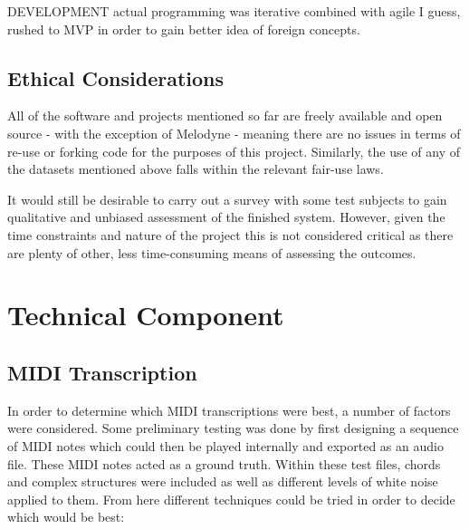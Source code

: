 \documentclass[12pt,]{article}
\begin{document}
DEVELOPMENT actual programming was iterative combined with agile I
guess, rushed to MVP in order to gain better idea of foreign concepts.

\hypertarget{ethical-considerations}{%
\subsection{Ethical Considerations}\label{ethical-considerations}}

All of the software and projects mentioned so far are freely available
and open source - with the exception of Melodyne - meaning there are no
issues in terms of re-use or forking code for the purposes of this
project. Similarly, the use of any of the datasets mentioned above falls
within the relevant fair-use laws.

It would still be desirable to carry out a survey with some test
subjects to gain qualitative and unbiased assessment of the finished
system. However, given the time constraints and nature of the project
this is not considered critical as there are plenty of other, less
time-consuming means of assessing the outcomes.

\hypertarget{technical-component}{%
\section{Technical Component}\label{technical-component}}

\hypertarget{midi-transcription}{%
\subsection{MIDI Transcription}\label{midi-transcription}}

In order to determine which MIDI transcriptions were best, a number of
factors were considered. Some preliminary testing was done by first
designing a sequence of MIDI notes which could then be played internally
and exported as an audio file. These MIDI notes acted as a ground truth.
Within these test files, chords and complex structures were included as
well as different levels of white noise applied to them. From here
different techniques could be tried in order to decide which would be
best:
\end{document}
